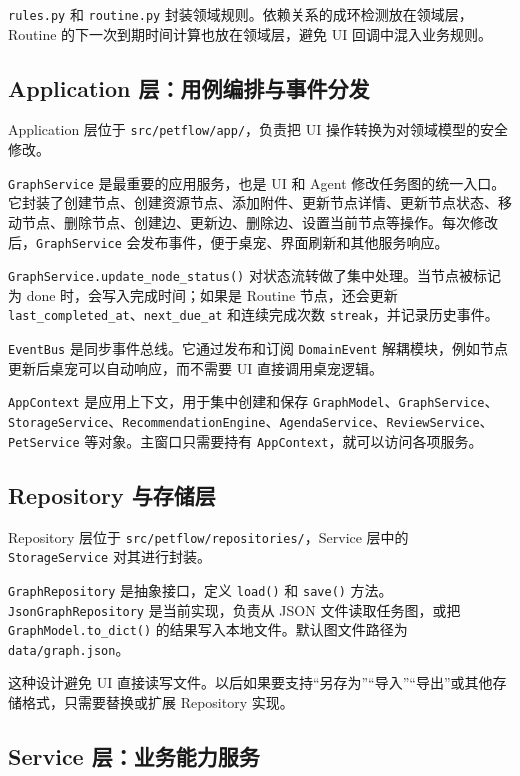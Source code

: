 \documentclass[UTF8,a4paper,12pt,fontset=none]{ctexart}
\begin{document}
\texttt{rules.py} 和 \texttt{routine.py} 封装领域规则。依赖关系的成环检测放在领域层，Routine 的下一次到期时间计算也放在领域层，避免 UI 回调中混入业务规则。

\subsection{Application 层：用例编排与事件分发}

Application 层位于 \texttt{src/petflow/app/}，负责把 UI 操作转换为对领域模型的安全修改。

\texttt{GraphService} 是最重要的应用服务，也是 UI 和 Agent 修改任务图的统一入口。它封装了创建节点、创建资源节点、添加附件、更新节点详情、更新节点状态、移动节点、删除节点、创建边、更新边、删除边、设置当前节点等操作。每次修改后，\texttt{GraphService} 会发布事件，便于桌宠、界面刷新和其他服务响应。

\texttt{GraphService.update\_node\_status()} 对状态流转做了集中处理。当节点被标记为 done 时，会写入完成时间；如果是 Routine 节点，还会更新 \texttt{last\_completed\_at}、\texttt{next\_due\_at} 和连续完成次数 \texttt{streak}，并记录历史事件。

\texttt{EventBus} 是同步事件总线。它通过发布和订阅 \texttt{DomainEvent} 解耦模块，例如节点更新后桌宠可以自动响应，而不需要 UI 直接调用桌宠逻辑。

\texttt{AppContext} 是应用上下文，用于集中创建和保存 \texttt{GraphModel}、\texttt{GraphService}、\texttt{StorageService}、\texttt{RecommendationEngine}、\texttt{AgendaService}、\texttt{ReviewService}、\texttt{PetService} 等对象。主窗口只需要持有 \texttt{AppContext}，就可以访问各项服务。

\subsection{Repository 与存储层}

Repository 层位于 \texttt{src/petflow/repositories/}，Service 层中的 \texttt{StorageService} 对其进行封装。

\texttt{GraphRepository} 是抽象接口，定义 \texttt{load()} 和 \texttt{save()} 方法。\texttt{JsonGraphRepository} 是当前实现，负责从 JSON 文件读取任务图，或把 \texttt{GraphModel.to\_dict()} 的结果写入本地文件。默认图文件路径为 \texttt{data/graph.json}。

这种设计避免 UI 直接读写文件。以后如果要支持“另存为”“导入”“导出”或其他存储格式，只需要替换或扩展 Repository 实现。

\subsection{Service 层：业务能力服务}
\end{document}
